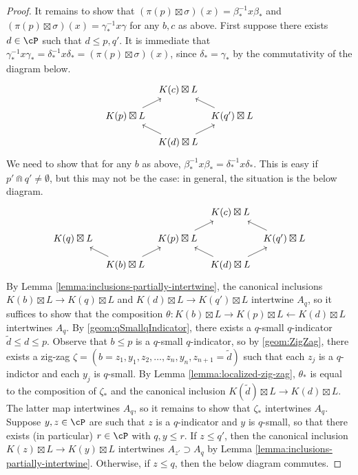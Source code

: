 \documentclass[11pt,reqno]{amsart}
\numberwithin{equation}{section}
\theoremstyle{plain}
\theoremstyle{definition}
\begin{document}
\begin{proof}
    It remains to show that $(\pi(p)\boxtimes \sigma)(x)=\beta_*^{-1}x\beta_*$ and $(\pi(p)\boxtimes \sigma)(x)=\gamma_*^{-1}x\gamma$ for any $b,c$ as above. First suppose there exists $d\in{\cP}$ such that $d\leq p,q'$. It is immediate that $\gamma_*^{-1}x\gamma_*=\delta_*^{-1}x\delta_*=(\pi(p)\boxtimes \sigma)(x)$, since $\delta_*=\gamma_*$ by the commutativity of the diagram below.
    \[
    \begin{tikzcd}[column sep=.5em, row sep=.5em]
	& {K(c)\boxtimes L} & \\
	\\
	{K(p)\boxtimes L} && {K(q')\boxtimes L} \\
	\\
	& {K(d)\boxtimes L}
	\arrow[from=3-1, to=1-2]
	\arrow[from=3-3, to=1-2]
	\arrow[from=5-2, to=3-1]
	\arrow[from=5-2, to=3-3]
\end{tikzcd}
\]
We need to show that for any $b$ as above, $\beta_*^{-1}x\beta_*=\delta_*^{-1}x\delta_*$. This is easy if $p'\Cap q'\neq\emptyset$, but this may not be the case: in general, the situation is the below diagram.
\[
\begin{tikzcd}[column sep=.5em, row sep=.5em]
	&&& {K(c)\boxtimes L} & \\
	\\
	{K(q)\boxtimes L} && {K(p)\boxtimes L} && {K(q')\boxtimes L} \\
	\\
	& {K(b)\boxtimes L} && {K(d)\boxtimes L}
	\arrow[from=3-3, to=1-4]
	\arrow[from=3-5, to=1-4]
	\arrow[from=5-2, to=3-1]
	\arrow[from=5-2, to=3-3]
	\arrow[from=5-4, to=3-3]
	\arrow[from=5-4, to=3-5]
\end{tikzcd}
\]
By Lemma \ref{lemma:inclusions-partially-intertwine}, the canonical inclusions $K(b)\boxtimes L\to K(q)\boxtimes L$ and $K(d)\boxtimes L\to K(q')\boxtimes L$ intertwine $A_q$, so it suffices to show that the composition $\theta:K(b)\boxtimes L\to K(p)\boxtimes L\xleftarrow{}K(d)\boxtimes L$ intertwines $A_q$. By \ref{geom:qSmallqIndicator}, there exists a $q$-small $q$-indicator $\widetilde{d}\leq d\leq p$. Observe that $b\leq p$ is a $q$-small $q$-indicator, so by \ref{geom:ZigZag}, there exists a zig-zag $\zeta=(b=z_1,y_1,z_2,\dots,z_n,y_n,z_{n+1}=\widetilde{d})$ such that each $z_j$ is a $q$-indictor and each $y_j$ is $q$-small. By Lemma \ref{lemma:localized-zig-zag}, $\theta_*$ is equal to the composition of $\zeta_*$ and the canonical inclusion $K(\widetilde{d})\boxtimes L\to K(d)\boxtimes L$. The latter map intertwines $A_q$, so it remains to show that $\zeta_*$ intertwines $A_q$. Suppose $y,z\in{\cP}$ are such that $z$ is a $q$-indicator and $y$ is $q$-small, so that there exists (in particular) $r\in{\cP}$ with $q,y\leq r$. If $z\leq q'$, then the canonical inclusion $K(z)\boxtimes L\to K(y)\boxtimes L$ intertwines $A_{z'}\supset A_{q}$ by Lemma \ref{lemma:inclusions-partially-intertwine}. Otherwise, if $z\leq q$, then the below diagram commutes.

\end{proof}
\end{document}
